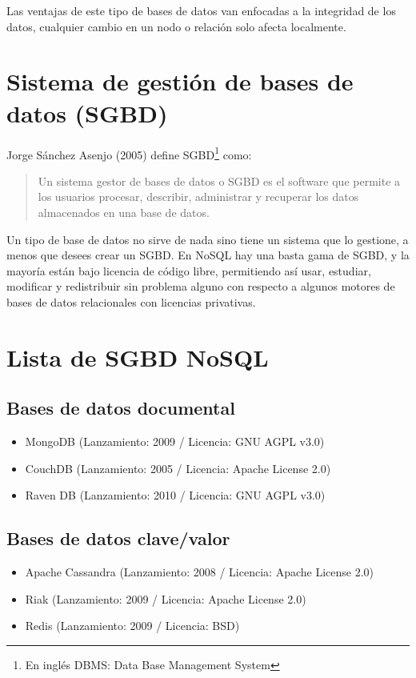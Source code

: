 Las ventajas de este tipo de bases de datos van enfocadas a la integridad de los datos, cualquier cambio en un nodo o relaci\'on solo afecta localmente.

\section{Sistema de gesti\'on de bases de datos (SGBD)}

Jorge Sánchez Asenjo (2005) define SGBD\footnote{En ingl\'es DBMS: Data Base Management System} como:

\begin{quote}
Un sistema gestor de bases de datos o SGBD es el software que permite a los usuarios procesar, describir, administrar y recuperar los datos almacenados en una base de datos. 
\end{quote}

Un tipo de base de datos no sirve de nada sino tiene un sistema que lo gestione, a menos que desees crear un SGBD. En NoSQL hay una basta gama de SGBD, y la mayor\'ia est\'an bajo licencia de c\'odigo libre, permitiendo as\'i usar, estudiar, modificar y redistribuir sin problema alguno con respecto a algunos motores de bases de datos relacionales con licencias privativas.

\section{Lista de SGBD NoSQL}

\subsection*{Bases de datos documental}

\begin{itemize}
\item MongoDB (Lanzamiento: 2009 / Licencia: GNU AGPL v3.0)
\item CouchDB (Lanzamiento: 2005 / Licencia: Apache License 2.0)
\item Raven DB (Lanzamiento: 2010 / Licencia: GNU AGPL v3.0)
\end{itemize}

\subsection*{Bases de datos clave/valor}

\begin{itemize}
\item Apache Cassandra (Lanzamiento: 2008 / Licencia: Apache License 2.0)
\item Riak (Lanzamiento: 2009 / Licencia: Apache License 2.0)
\item Redis (Lanzamiento: 2009 / Licencia: BSD)
\end{itemize}


